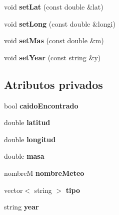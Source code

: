 \begin{DoxyCompactItemize}
\item 
\hypertarget{classdefM_ae14ecfda1fbe9af79e076aca96c3767a}{void {\bfseries set\-Lat} (const double \&lat)}\label{classdefM_ae14ecfda1fbe9af79e076aca96c3767a}

\item 
\hypertarget{classdefM_a85ed696e81534232b144de393b8e31ac}{void {\bfseries set\-Long} (const double \&longi)}\label{classdefM_a85ed696e81534232b144de393b8e31ac}

\item 
\hypertarget{classdefM_ae0aae6cbc83073b714403fd2532f29e7}{void {\bfseries set\-Mas} (const double \&m)}\label{classdefM_ae0aae6cbc83073b714403fd2532f29e7}

\item 
\hypertarget{classdefM_a1fb9d0be4b62c10d7296851d5393fe34}{void {\bfseries set\-Year} (const string \&y)}\label{classdefM_a1fb9d0be4b62c10d7296851d5393fe34}

\end{DoxyCompactItemize}
\subsection*{Atributos privados}
\begin{DoxyCompactItemize}
\item 
\hypertarget{classdefM_a05a0d2f33093c72853d402105c26e2c8}{bool {\bfseries caido\-Encontrado}}\label{classdefM_a05a0d2f33093c72853d402105c26e2c8}

\item 
\hypertarget{classdefM_a57bb1b855925ea46c788a227cc9489d6}{double {\bfseries latitud}}\label{classdefM_a57bb1b855925ea46c788a227cc9489d6}

\item 
\hypertarget{classdefM_abff74a1176e75e54d2e10c1efd5a202d}{double {\bfseries longitud}}\label{classdefM_abff74a1176e75e54d2e10c1efd5a202d}

\item 
\hypertarget{classdefM_a208dfa18daa553785074cc6c7f48228d}{double {\bfseries masa}}\label{classdefM_a208dfa18daa553785074cc6c7f48228d}

\item 
\hypertarget{classdefM_a44525d0b487d7b8fc2d1f183d55582fe}{nombre\-M {\bfseries nombre\-Meteo}}\label{classdefM_a44525d0b487d7b8fc2d1f183d55582fe}

\item 
\hypertarget{classdefM_a579ed25cec0dd45ada1fc6e07e690853}{vector$<$ string $>$ {\bfseries tipo}}\label{classdefM_a579ed25cec0dd45ada1fc6e07e690853}

\item 
\hypertarget{classdefM_a3e251d235e7f03c5f911e5f699b039ec}{string {\bfseries year}}\label{classdefM_a3e251d235e7f03c5f911e5f699b039ec}

\end{DoxyCompactItemize}

